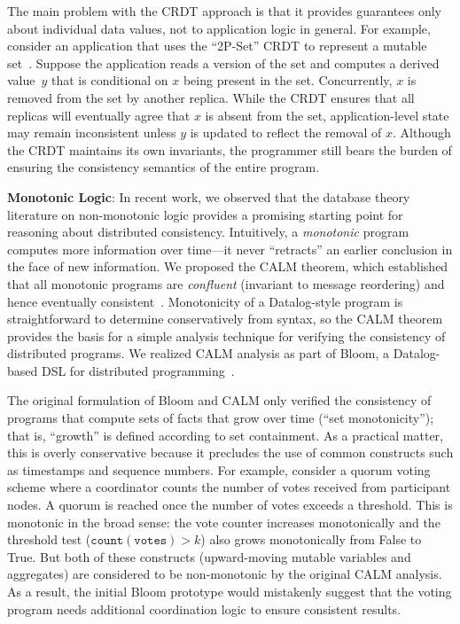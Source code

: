The main problem with the CRDT approach is that it provides guarantees only
about individual data values, not to application logic in general. For example,
consider an application that uses the ``2P-Set'' CRDT to represent a mutable
set~\cite{Shapiro2011a}. Suppose the application reads a version of the set and
computes a derived value~$y$ that is conditional on $x$ being present in the
set. Concurrently, $x$ is removed from the set by another replica. While the
CRDT ensures that all replicas will eventually agree that $x$ is absent from the
set, application-level state may remain inconsistent unless $y$ is updated to
reflect the removal of $x$. Although the CRDT maintains its own invariants, the
programmer still bears the burden of ensuring the consistency semantics of the
entire program.


\vspace{0.5em} \noindent
\textbf{Monotonic Logic}: In recent work, we observed that the database theory
literature on non-monotonic logic provides a promising starting point for
reasoning about distributed consistency. Intuitively, a \emph{monotonic} program
computes more information over time---it never ``retracts'' an earlier
conclusion in the face of new information. We proposed the CALM theorem, which
established that all monotonic programs are \emph{confluent} (invariant to
message reordering) and hence eventually
consistent~\cite{Ameloot2011,Hellerstein2010,dedalus-pods12-tr}. Monotonicity of
a Datalog-style program is straightforward to determine conservatively from
syntax, so the CALM theorem provides the basis for a simple analysis technique
for verifying the consistency of distributed programs. We realized CALM analysis
as part of Bloom, a Datalog-based DSL for distributed
programming~\cite{Alvaro2011,bloom}.

The original formulation of Bloom and CALM only verified the consistency of
programs that compute sets of facts that grow over time (``set monotonicity'');
that is, ``growth'' is defined according to set containment. As a practical
matter, this is overly conservative because it precludes the use of common
constructs such as timestamps and sequence numbers. For example, consider a
quorum voting scheme where a coordinator counts the number of votes received
from participant nodes. A quorum is reached once the number of votes exceeds a
threshold. This is monotonic in the broad sense: the vote counter increases
monotonically and the threshold test ($\mathtt{count(votes)} > k$) also grows
monotonically from False to True. But both of these constructs (upward-moving
mutable variables and aggregates) are considered to be non-monotonic by the
original CALM analysis.  As a result, the initial Bloom prototype would
mistakenly suggest that the voting program needs additional coordination logic
to ensure consistent results.

